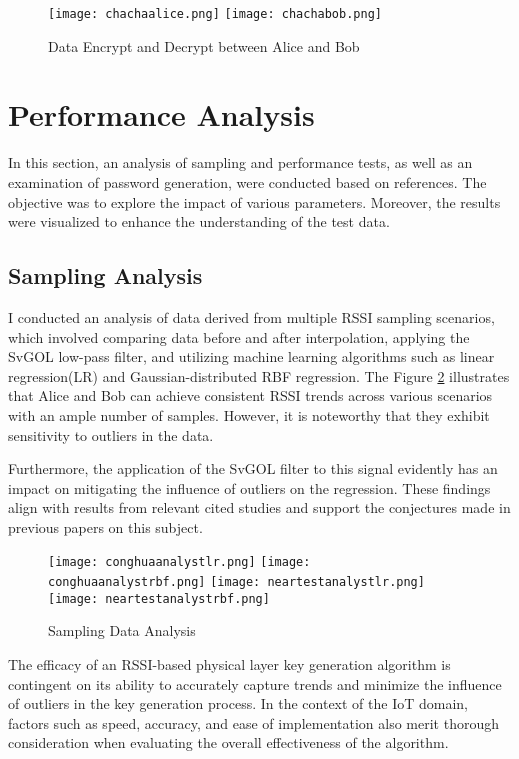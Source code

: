 \begin{figure}
  \centering
  {\texttt{[image: chachaalice.png]}}
  {\texttt{[image: chachabob.png]}}
  \caption{Data Encrypt and Decrypt between Alice and Bob}\label{Data Encrypt and Decrypt}
\end{figure}

\section{Performance Analysis}
In this section, an analysis of sampling and performance tests, as well as an examination of password generation, were conducted based on references. The objective was to explore the impact of various parameters. Moreover, the results were visualized to enhance the understanding of the test data.

\subsection{Sampling Analysis}
I conducted an analysis of data derived from multiple RSSI sampling scenarios, which involved comparing data before and after interpolation, applying the SvGOL low-pass filter, and utilizing machine learning algorithms such as linear regression(LR) and Gaussian-distributed RBF regression. The Figure \ref{Sampling Data Analysis} illustrates that Alice and Bob can achieve consistent RSSI trends across various scenarios with an ample number of samples. However, it is noteworthy that they exhibit sensitivity to outliers in the data.

Furthermore, the application of the SvGOL filter to this signal evidently has an impact on mitigating the influence of outliers on the regression. These findings align with results from relevant cited studies and support the conjectures made in previous papers on this subject.
\begin{figure}
  \centering
  {\texttt{[image: conghuaanalystlr.png]}}
  {\texttt{[image: conghuaanalystrbf.png]}}
  {\texttt{[image: neartestanalystlr.png]}}
  {\texttt{[image: neartestanalystrbf.png]}}
  \caption{Sampling Data Analysis}\label{Sampling Data Analysis}
\end{figure}
The efficacy of an RSSI-based physical layer key generation algorithm is contingent on its ability to accurately capture trends and minimize the influence of outliers in the key generation process. In the context of the IoT domain, factors such as speed, accuracy, and ease of implementation also merit thorough consideration when evaluating the overall effectiveness of the algorithm.

